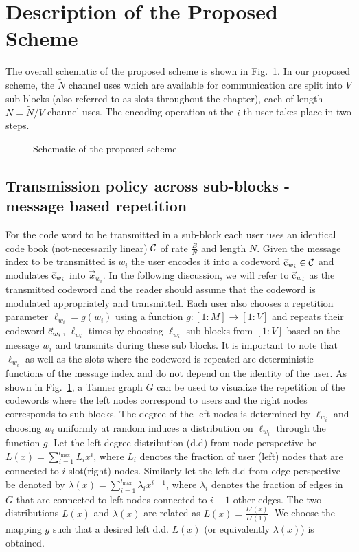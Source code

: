 \section{Description of the Proposed Scheme}
The overall schematic of the proposed scheme is shown in Fig.~\ref{fig:overallscheme}. In our proposed scheme, the $\tilde{N}$ channel uses which are available for communication are split into $V$ sub-blocks (also referred to as slots throughout the chapter), each of length $N=\tilde{N}/V$ channel uses. The encoding operation at the $i$-th user takes place in two steps.

\begin{figure}[h]
  \centering
  \resizebox{0.9\textwidth}{!}{}
  \caption{Schematic of the proposed scheme}
  \label{fig:overallscheme}
\end{figure}

\subsection{Transmission policy across sub-blocks - message based repetition}
\label{sec:Txpolicy_TannerGraph}
For the code word to be transmitted in a sub-block each user uses an identical code book (not-necessarily linear) $\mathcal{C}$ of rate $\frac{B}{N}$ and length $N$. Given the message index to be transmitted is $w_i$ the user encodes it into a codeword $\vec{\mathrm{c}}_{w_i} \in \mathcal{C}$ and modulates $\vec{\mathrm{c}}_{w_i}$ into $\vec{x}_{w_i}$. In the following discussion, we will refer to $\vec{\mathrm{c}}_{w_i}$ as the transmitted codeword and the reader should assume that the codeword is modulated appropriately and transmitted. Each user also chooses a repetition parameter $\ell_{w_i}=g(w_i)$ using a function $g:[1:M] \rightarrow [1:V]$ and repeats their codeword $\vec{\mathrm{c}}_{w_i}$, $\ell_{w_i}$ times by choosing $\ell_{w_i}$ sub blocks from $[1:V]$ based on the message $w_i$ and transmits during these sub blocks. It is important to note that $\ell_{w_i}$ as well as the slots where the codeword is repeated are deterministic functions of the message index and do not depend on the identity of the user. As shown in Fig.~\ref{fig:overallscheme}, a Tanner graph $G$ can be used to visualize the repetition of the codewords where the left nodes correspond to users and the right nodes corresponds to sub-blocks. The degree of the left nodes is determined by $\ell_{w_i}$ and choosing $w_i$ uniformly at random induces a distribution on $\ell_{w_i}$ through the function $g$.  Let the left degree distribution (d.d) from node perspective be $L(x) = \sum_{{i=1}}^{{l_{\max}}} L_i x^i$, where $L_i$ denotes the fraction of user (left) nodes that are connected to $i$ slot(right) nodes. Similarly let the left d.d from edge perspective be denoted by $\lambda(x) = \sum_{{i=1}}^{{l_{\max}}} \lambda_i x^{i-1}$, where $\lambda_i$ denotes the fraction of edges in $G$ that are connected to left nodes connected to $i-1$ other edges. The two distributions $L(x)$ and $\lambda(x)$ are related as $L(x)=\frac{L'(x)}{L'(1)}$. We choose the mapping $g$ such that a desired left d.d. $L(x)$ (or equivalently $\lambda(x)$) is obtained.

